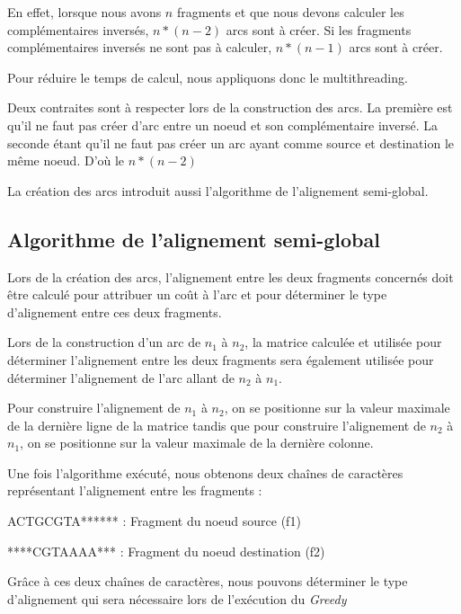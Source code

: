 \documentclass[12pt,a4paper,final]{article}
\begin{document}
En effet, lorsque nous avons $n$ fragments et que nous devons calculer les complémentaires inversés, $n*(n-2)$ arcs sont à créer.  Si les fragments complémentaires inversés ne sont pas à calculer, $n*(n-1)$ arcs sont à créer.\medskip

Pour réduire le temps de calcul, nous appliquons donc le multithreading.\medskip

Deux contraites sont à respecter lors de la construction des arcs.  La première est qu'il ne faut pas créer d'arc entre un noeud et son complémentaire inversé.  La seconde étant qu'il ne faut pas créer un arc ayant comme source et destination le même noeud.  D'où le $n*(n-2)$\medskip

La création des arcs introduit aussi l'algorithme de l'alignement semi-global.\medskip

\subsection{Algorithme de l'alignement semi-global}

Lors de la création des arcs, l'alignement entre les deux fragments concernés doit être calculé pour attribuer un coût à l'arc et pour déterminer le type d'alignement entre ces deux fragments.\medskip

Lors de la construction d'un arc de $n_1$ à $n_2$, la matrice calculée et utilisée pour déterminer l'alignement entre les deux fragments sera également utilisée pour déterminer l'alignement de l'arc allant de $n_2$ à $n_1$.\medskip

Pour construire l'alignement de $n_1$ à $n_2$, on se positionne sur la valeur maximale de la dernière ligne de la matrice tandis que pour construire l'alignement de $n_2$ à $n_1$, on se positionne sur la valeur maximale de la dernière colonne.\medskip

Une fois l'algorithme exécuté, nous obtenons deux chaînes de caractères représentant l'alignement entre les fragments : \medskip

ACTGCGTA****** : Fragment du noeud source (f1)\medskip

****CGTAAAA*** : Fragment du noeud destination (f2) \medskip


Grâce à ces deux chaînes de caractères, nous pouvons déterminer le type d'alignement qui sera nécessaire lors de l'exécution du \textit{Greedy}\medskip

\end{document}
